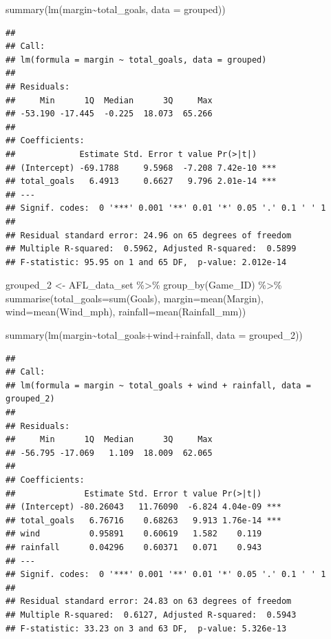 \documentclass[
]{article}
\newenvironment{Shaded}{\begin{snugshade}}{\end{snugshade}}
\newcommand{\AttributeTok}[1]{\textcolor[rgb]{0.77,0.63,0.00}{#1}}
\newcommand{\FunctionTok}[1]{\textcolor[rgb]{0.00,0.00,0.00}{#1}}
\newcommand{\NormalTok}[1]{#1}
\newcommand{\OtherTok}[1]{\textcolor[rgb]{0.56,0.35,0.01}{#1}}
\newcommand{\SpecialCharTok}[1]{\textcolor[rgb]{0.00,0.00,0.00}{#1}}
\begin{document}
\begin{Shaded}
\begin{Highlighting}[]
\FunctionTok{summary}\NormalTok{(}\FunctionTok{lm}\NormalTok{(margin}\SpecialCharTok{\textasciitilde{}}\NormalTok{total\_goals, }\AttributeTok{data =}\NormalTok{ grouped))}
\end{Highlighting}
\end{Shaded}

\begin{verbatim}
## 
## Call:
## lm(formula = margin ~ total_goals, data = grouped)
## 
## Residuals:
##     Min      1Q  Median      3Q     Max 
## -53.190 -17.445  -0.225  18.073  65.266 
## 
## Coefficients:
##             Estimate Std. Error t value Pr(>|t|)    
## (Intercept) -69.1788     9.5968  -7.208 7.42e-10 ***
## total_goals   6.4913     0.6627   9.796 2.01e-14 ***
## ---
## Signif. codes:  0 '***' 0.001 '**' 0.01 '*' 0.05 '.' 0.1 ' ' 1
## 
## Residual standard error: 24.96 on 65 degrees of freedom
## Multiple R-squared:  0.5962, Adjusted R-squared:  0.5899 
## F-statistic: 95.95 on 1 and 65 DF,  p-value: 2.012e-14
\end{verbatim}

\begin{Shaded}
\begin{Highlighting}[]
\NormalTok{grouped\_2 }\OtherTok{\textless{}{-}}\NormalTok{ AFL\_data\_set }\SpecialCharTok{\%\textgreater{}\%}
  \FunctionTok{group\_by}\NormalTok{(Game\_ID) }\SpecialCharTok{\%\textgreater{}\%}
  \FunctionTok{summarise}\NormalTok{(}\AttributeTok{total\_goals=}\FunctionTok{sum}\NormalTok{(Goals), }\AttributeTok{margin=}\FunctionTok{mean}\NormalTok{(Margin), }\AttributeTok{wind=}\FunctionTok{mean}\NormalTok{(Wind\_mph), }\AttributeTok{rainfall=}\FunctionTok{mean}\NormalTok{(Rainfall\_mm))}

\FunctionTok{summary}\NormalTok{(}\FunctionTok{lm}\NormalTok{(margin}\SpecialCharTok{\textasciitilde{}}\NormalTok{total\_goals}\SpecialCharTok{+}\NormalTok{wind}\SpecialCharTok{+}\NormalTok{rainfall, }\AttributeTok{data =}\NormalTok{ grouped\_2))}
\end{Highlighting}
\end{Shaded}

\begin{verbatim}
## 
## Call:
## lm(formula = margin ~ total_goals + wind + rainfall, data = grouped_2)
## 
## Residuals:
##     Min      1Q  Median      3Q     Max 
## -56.795 -17.069   1.109  18.009  62.065 
## 
## Coefficients:
##              Estimate Std. Error t value Pr(>|t|)    
## (Intercept) -80.26043   11.76090  -6.824 4.04e-09 ***
## total_goals   6.76716    0.68263   9.913 1.76e-14 ***
## wind          0.95891    0.60619   1.582    0.119    
## rainfall      0.04296    0.60371   0.071    0.943    
## ---
## Signif. codes:  0 '***' 0.001 '**' 0.01 '*' 0.05 '.' 0.1 ' ' 1
## 
## Residual standard error: 24.83 on 63 degrees of freedom
## Multiple R-squared:  0.6127, Adjusted R-squared:  0.5943 
## F-statistic: 33.23 on 3 and 63 DF,  p-value: 5.326e-13
\end{verbatim}
\end{document}

